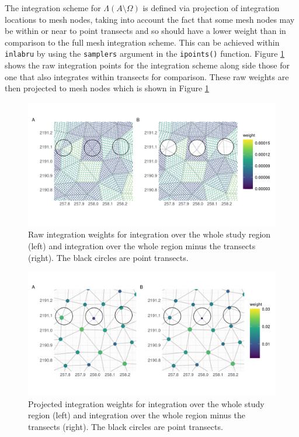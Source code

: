 \documentclass[12pt]{article}
\begin{document}
The integration scheme for $\Lambda(A \setminus \Omega)$ is defined via projection of integration locations to mesh nodes, taking into account the fact that some mesh nodes may be within or near to point transects and so should have a lower weight than in comparison to the full mesh integration scheme.  This can be achieved within \texttt{inlabru} by using the \texttt{samplers} argument in the \texttt{ipoints()} function.  Figure \ref{fig:int_scheme_raw} shows the raw integration points for the integration scheme along side those for one that also integrates within transects for comparison.  These raw weights are then projected to mesh nodes which is shown in Figure \ref{fig:int_scheme_raw}
\begin{figure}
	\centering
	\includegraphics[width=\textwidth]{figures/compare_int_scheme_raw.png}
	\caption{Raw integration weights for integration over the whole study region (left) and integration over the whole region minus the transects (right).  The black circles are point transects.}
	\label{fig:int_scheme_raw}
\end{figure}
\begin{figure}
	\centering
	\includegraphics[width=\textwidth]{figures/compare_int_scheme_projected.png}
	\caption{Projected integration weights for integration over the whole study region (left) and integration over the whole region minus the transects (right).  The black circles are point transects.}
	\label{fig:int_scheme_projected}
\end{figure}
\end{document}
